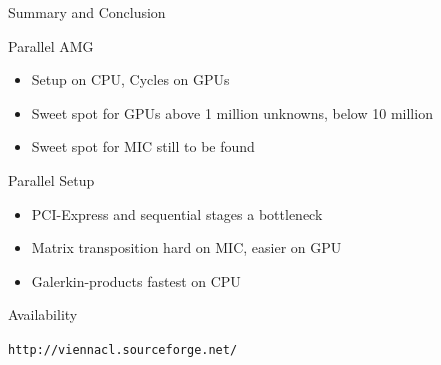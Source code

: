 
\begin{frame}{Summary and Conclusion}

  \begin{block}{Parallel AMG}
    \begin{itemize}
     \item Setup on CPU, Cycles on GPUs
     \item Sweet spot for GPUs above 1 million unknowns, below 10 million
     \item Sweet spot for MIC still to be found
    \end{itemize}
  \end{block}

  \begin{block}{Parallel Setup}
    \begin{itemize}
     \item PCI-Express and sequential stages a bottleneck
     \item Matrix transposition hard on MIC, easier on GPU
     \item Galerkin-products fastest on CPU
    \end{itemize}
  \end{block}

  \begin{block}{Availability}
  \begin{center}
   \texttt{http://viennacl.sourceforge.net/}
  \end{center}

  \end{block}

\end{frame}


